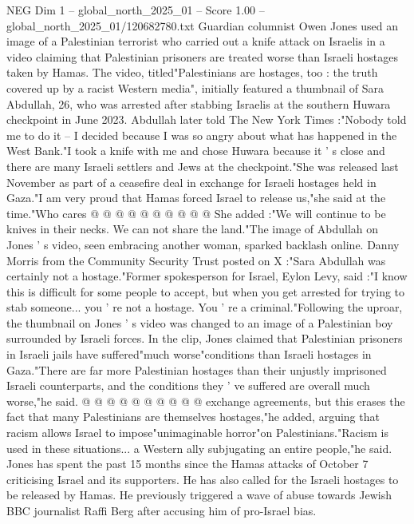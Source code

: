 \begin{textsample}{NEG Dim 1 – global\_north\_2025\_01 – Score 1.00 – global\_north\_2025\_01/120682780.txt}  \label{ex:f1_neg_066}
Guardian columnist Owen Jones used an image of a Palestinian terrorist who carried out a knife attack on Israelis in a video claiming that Palestinian prisoners are treated worse than Israeli hostages taken by Hamas.
The video, titled"Palestinians are hostages, too : the truth covered up by a racist Western media", initially featured a thumbnail of Sara Abdullah, 26, who was arrested after stabbing Israelis at the southern Huwara checkpoint in June 2023.
Abdullah later told The New York Times :"Nobody told me to do it -- I decided because I was so angry about what has happened in the West Bank."I took a knife with me and chose Huwara because it ' s close and there are many Israeli settlers and Jews at the checkpoint."She was released last November as part of a ceasefire deal in exchange for Israeli hostages held in Gaza."I am very proud that Hamas forced Israel to release us,"she said at the time."Who cares @ @ @ @ @ @ @ @ @ @ She added :"We will continue to be knives in their necks.
We can not share the land."The image of Abdullah on Jones ' s video, seen embracing another woman, sparked backlash online.
Danny Morris from the Community Security Trust posted on X :"Sara Abdullah was certainly not a hostage."Former spokesperson for Israel, Eylon Levy, said :"I know this is difficult for some people to accept, but when you get arrested for trying to stab someone... you ' re not a hostage.
You ' re a criminal."Following the uproar, the thumbnail on Jones ' s video was changed to an image of a Palestinian boy surrounded by Israeli forces.
In the clip, Jones claimed that Palestinian prisoners in Israeli jails have suffered"much worse"conditions than Israeli hostages in Gaza."There are far more Palestinian hostages than their unjustly imprisoned Israeli counterparts, and the conditions they ' ve suffered are overall much worse,"he said. @ @ @ @ @ @ @ @ @ @ exchange agreements, but this erases the fact that many Palestinians are themselves hostages,"he added, arguing that racism allows Israel to impose"unimaginable horror"on Palestinians."Racism is used in these situations... a Western ally subjugating an entire people,"he said.
Jones has spent the past 15 months since the Hamas attacks of October 7 criticising Israel and its supporters.
He has also called for the Israeli hostages to be released by Hamas.
He previously triggered a wave of abuse towards Jewish BBC journalist Raffi Berg after accusing him of pro-Israel bias.

\end{textsample}
